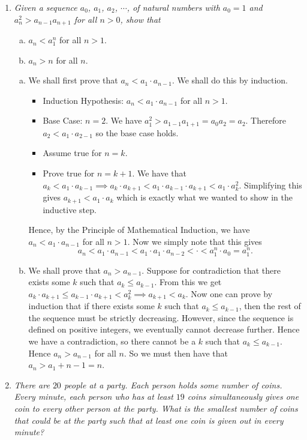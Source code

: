 \documentclass{article}
\begin{document}
\begin{enumerate}[1.]
\item %
{\itshape Given a sequence $a_0$, $a_1$, $a_2$, $\cdots$, of natural numbers with $a_0 = 1$ and $a_{n}^2 > a_{n - 1}a_{n + 1}$ for all $n > 0$, show that 
\begin{enumerate}[a)]
  \item $a_n < a_1^n$ for all $n > 1$.
  \item $a_n > n$ for all $n$.
\end{enumerate}}

\begin{enumerate}[a)]
  \item We shall first prove that $a_n < a_1 \cdot a_{n - 1}$. We shall do this by induction.
  \begin{itemize}
    \item Induction Hypothesis: $a_n < a_1 \cdot a_{n - 1}$ for all $n > 1$.
    \item Base Case: $n = 2$. We have $a_{1}^2 > a_{1 - 1}a_{1 + 1} = a_0a_2 = a_2$. Therefore $a_2 < a_1 \cdot a_{2 - 1}$ so the base case holds.
    \item Assume true for $n = k$.
    \item Prove true for $n = k + 1$. We have that $a_k < a_1 \cdot a_{k - 1} \implies a_k \cdot a_{k + 1} < a_1 \cdot a_{k - 1} \cdot a_{k + 1} < a_1 \cdot a_k^2$. Simplifying this gives $a_{k + 1} < a_1 \cdot a_k$ which is exactly what we wanted to show in the inductive step.
  \end{itemize}
  Hence, by the Principle of Mathematical Induction, we have $a_n < a_1 \cdot a_{n - 1}$ for all $n > 1$. Now we simply note that this gives 
  $$a_n < a_1 \cdot a_{n - 1} < a_1 \cdot a_1 \cdot a_{n - 2} < \cdot < a_1^n \cdot a_0 = a_1^n.$$
  \item We shall prove that $a_n > a_{n - 1}$. Suppose for contradiction that there exists some $k$ such that $a_k \le a_{k - 1}$. From this we get $a_k \cdot a_{k + 1} \le a_{k - 1} \cdot a_{k + 1} < a_k^2 \implies a_{k + 1} < a_k$. Now one can prove by induction that if there exists some $k$ such that $a_k \le a_{k - 1}$, then the rest of the sequence must be strictly decreasing. However, since the sequence is defined on positive integers, we eventually cannot decrease further. Hence we have a contradiction, so there cannot be a $k$ such that $a_k \le a_{k - 1}$. Hence $a_n > a_{n - 1}$ for all $n$. So we must then have that $a_n > a_1 + {n - 1} = n$.
\end{enumerate}


\item %
{\itshape There are $20$ people at a party. Each person holds some number of coins. Every minute, each person who has at least $19$ coins simultaneously gives one coin to every other person at the party. What is the smallest number of coins that could be at the party such that at least one coin is given out in every minute?}


\end{enumerate}
\end{document}
